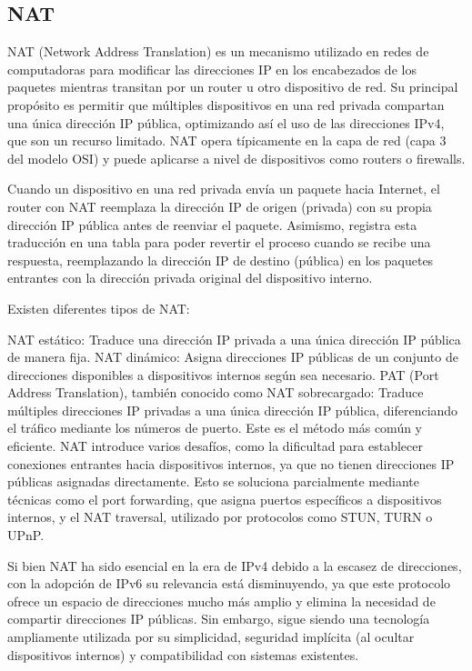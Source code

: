 \begin{enumerate}
\begin{enumerate}
\section{NAT}
NAT (Network Address Translation) es un mecanismo utilizado en redes de computadoras para modificar las direcciones IP en los encabezados de los paquetes mientras transitan por un router u otro dispositivo de red. Su principal propósito es permitir que múltiples dispositivos en una red privada compartan una única dirección IP pública, optimizando así el uso de las direcciones IPv4, que son un recurso limitado. NAT opera típicamente en la capa de red (capa 3 del modelo OSI) y puede aplicarse a nivel de dispositivos como routers o firewalls.

Cuando un dispositivo en una red privada envía un paquete hacia Internet, el router con NAT reemplaza la dirección IP de origen (privada) con su propia dirección IP pública antes de reenviar el paquete. Asimismo, registra esta traducción en una tabla para poder revertir el proceso cuando se recibe una respuesta, reemplazando la dirección IP de destino (pública) en los paquetes entrantes con la dirección privada original del dispositivo interno.

Existen diferentes tipos de NAT:

NAT estático: Traduce una dirección IP privada a una única dirección IP pública de manera fija.
NAT dinámico: Asigna direcciones IP públicas de un conjunto de direcciones disponibles a dispositivos internos según sea necesario.
PAT (Port Address Translation), también conocido como NAT sobrecargado: Traduce múltiples direcciones IP privadas a una única dirección IP pública, diferenciando el tráfico mediante los números de puerto. Este es el método más común y eficiente.
NAT introduce varios desafíos, como la dificultad para establecer conexiones entrantes hacia dispositivos internos, ya que no tienen direcciones IP públicas asignadas directamente. Esto se soluciona parcialmente mediante técnicas como el port forwarding, que asigna puertos específicos a dispositivos internos, y el NAT traversal, utilizado por protocolos como STUN, TURN o UPnP.

Si bien NAT ha sido esencial en la era de IPv4 debido a la escasez de direcciones, con la adopción de IPv6 su relevancia está disminuyendo, ya que este protocolo ofrece un espacio de direcciones mucho más amplio y elimina la necesidad de compartir direcciones IP públicas. Sin embargo, sigue siendo una tecnología ampliamente utilizada por su simplicidad, seguridad implícita (al ocultar dispositivos internos) y compatibilidad con sistemas existentes.


\end{enumerate}
\end{enumerate}
